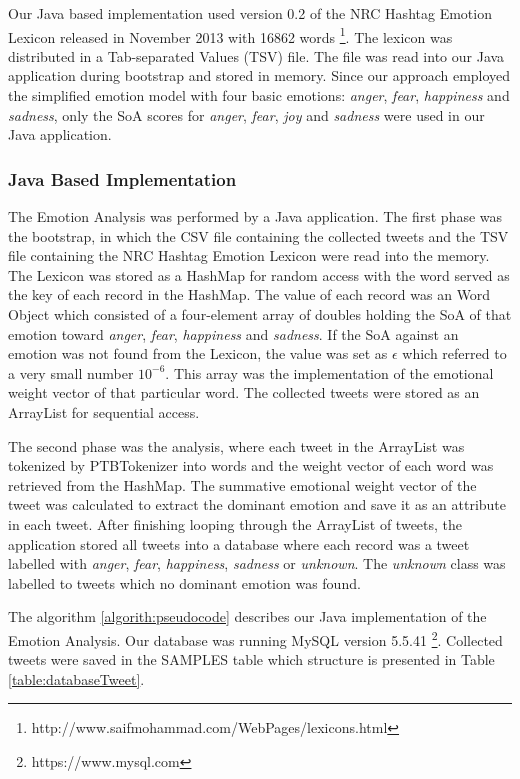 Our Java based implementation used version 0.2 of the NRC Hashtag Emotion Lexicon released in November 2013 with 16862 words \footnote{http://www.saifmohammad.com/WebPages/lexicons.html}. The lexicon was distributed in a Tab-separated Values (TSV) file. The file was read into our Java application during bootstrap and stored in memory. Since our approach employed the simplified emotion model with four basic emotions: \textit{anger}, \textit{fear}, \textit{happiness} and \textit{sadness}, only the SoA scores for \textit{anger}, \textit{fear}, \textit{joy} and \textit{sadness} were used in our Java application.

\subsubsection{Java Based Implementation}
The Emotion Analysis was performed by a Java application. The first phase was the bootstrap, in which the CSV file containing the collected tweets and the TSV file containing the NRC Hashtag Emotion Lexicon were read into the memory. The Lexicon was stored as a HashMap for random access with the word served as the key of each record in the HashMap. The value of each record was an Word Object which consisted of a four-element array of doubles holding the SoA of that emotion toward \textit{anger}, \textit{fear}, \textit{happiness} and \textit{sadness}. If the SoA against an emotion was not found from the Lexicon, the value was set as \(\epsilon\) which referred to a very small number \(10^{-6}\). This array was the implementation of the emotional weight vector of that particular word. The collected tweets were stored as an ArrayList for sequential access. 

The second phase was the analysis, where each tweet in the ArrayList was tokenized by PTBTokenizer into words and the weight vector of each word was retrieved from the HashMap. The summative emotional weight vector of the tweet was calculated to extract the dominant emotion and save it as an attribute in each tweet. After finishing looping through the ArrayList of tweets, the application stored all tweets into a database where each record was a tweet labelled with \textit{anger}, \textit{fear}, \textit{happiness}, \textit{sadness} or \textit{unknown}. The \textit{unknown} class was labelled to tweets which no dominant emotion was found.

The algorithm \ref{algorith:pseudocode} describes our Java implementation of the Emotion Analysis. Our database was running MySQL version 5.5.41 \footnote{https://www.mysql.com}. Collected tweets were saved in the SAMPLES table which structure is presented in Table \ref{table:databaseTweet}.

